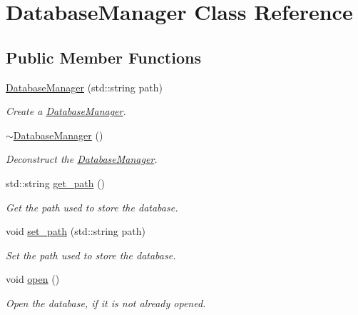\hypertarget{class_database_manager}{}\section{Database\+Manager Class Reference}
\label{class_database_manager}
\subsection*{Public Member Functions}
\begin{DoxyCompactItemize}
\item 
\hyperlink{class_database_manager_afc98bb0ecd0a4acd6094bc2de4a3c0f9}{Database\+Manager} (std\+::string path)
\begin{DoxyCompactList}\small\item\em Create a \hyperlink{class_database_manager}{Database\+Manager}. \end{DoxyCompactList}\item 
\hyperlink{class_database_manager_ae9b3a5da1e04fbb00faf8a034da1d063}{$\sim$\+Database\+Manager} ()
\begin{DoxyCompactList}\small\item\em Deconstruct the \hyperlink{class_database_manager}{Database\+Manager}. \end{DoxyCompactList}\item 
std\+::string \hyperlink{class_database_manager_a623413cf45f53334a7cde7ed030c9620}{get\+\_\+path} ()
\begin{DoxyCompactList}\small\item\em Get the path used to store the database. \end{DoxyCompactList}\item 
void \hyperlink{class_database_manager_aa3d5f606c609705694a7ece8e31cd987}{set\+\_\+path} (std\+::string path)
\begin{DoxyCompactList}\small\item\em Set the path used to store the database. \end{DoxyCompactList}\item 
\mbox{\label{class_database_manager_a6c583242d2a2971a285531886d08f377}} 
void \hyperlink{class_database_manager_a6c583242d2a2971a285531886d08f377}{open} ()
\begin{DoxyCompactList}\small\item\em Open the database, if it is not already opened. \end{DoxyCompactList}\item 

\end{DoxyCompactItemize}

